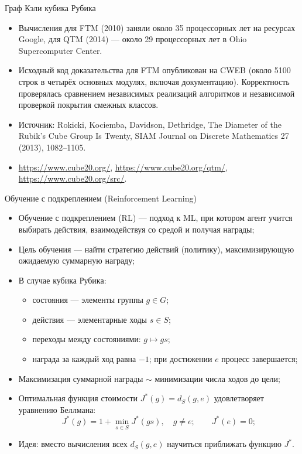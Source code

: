 \documentclass[serif, aspectratio=169]{beamer}
\begin{document}
\begin{frame}{Граф Кэли кубика Рубика}
{\begin{itemize}
        \item Вычисления для FTM (2010) заняли около 35 процессорных лет на ресурсах Google, для QTM (2014) --- около 29 процессорных лет в Ohio Supercomputer Center.
        \item Исходный код доказательства для FTM опубликован на CWEB (около 5100 строк в четырёх основных модулях, включая документацию). Корректность проверялась сравнением независимых реализаций алгоритмов и независимой проверкой покрытия смежных классов.
        \item Источник: Rokicki, Kociemba, Davidson, Dethridge, The Diameter of the Rubik's Cube Group Is Twenty, SIAM Journal on Discrete Mathematics 27 (2013), 1082--1105.
        \item \url{https://www.cube20.org/}, \url{https://www.cube20.org/qtm/}, \url{https://www.cube20.org/src/}.
    \end{itemize}
    }
\end{frame}

\begin{frame}{Обучение с подкреплением (Reinforcement Learning)}
    \begin{itemize}
        \item Обучение с подкреплением (RL) --- подход к ML, при котором агент учится выбирать действия, взаимодействуя со средой и получая награды;
        \item Цель обучения --- найти стратегию действий (политику), максимизирующую ожидаемую суммарную награду;
        \item В случае кубика Рубика:
        \begin{itemize}
            \item состояния --- элементы группы $g\in G$;
            \item действия --- элементарные ходы $s\in S$;
            \item переходы между состояниями: $g\mapsto gs$;
            \item награда за каждый ход равна $-1$; при достижении $e$ процесс завершается;
        \end{itemize}
        \item Максимизация суммарной награды $\sim$ минимизации числа ходов до цели;
        \item Оптимальная функция стоимости $J^*(g)=d_S(g,e)$ удовлетворяет уравнению Беллмана:
        \vspace{-1ex}
        \[J^*(g)=1+\min_{s\in S}J^*(gs),\quad g\ne e;\qquad J^*(e)=0;\]
        \item Идея: вместо вычисления всех $d_S(g,e)$ научиться приближать функцию $J^*$.
    \end{itemize}
    \note{
        \begin{itemize}
            \item ---
        \end{itemize}
    }
\end{frame}
\end{document}
